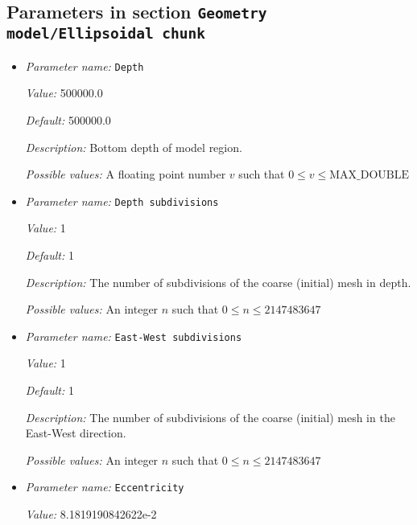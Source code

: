 \subsection{Parameters in section \tt Geometry model/Ellipsoidal chunk}
\label{parameters:Geometry_20model/Ellipsoidal_20chunk}

\begin{itemize}
\item {\it Parameter name:} {\tt Depth}
\label{parameters:Geometry model/Ellipsoidal chunk/Depth}


{\it Value:} 500000.0


{\it Default:} 500000.0


{\it Description:} Bottom depth of model region.


{\it Possible values:} A floating point number $v$ such that $0 \leq v \leq \text{MAX\_DOUBLE}$
\item {\it Parameter name:} {\tt Depth subdivisions}
\label{parameters:Geometry model/Ellipsoidal chunk/Depth subdivisions}


{\it Value:} 1


{\it Default:} 1


{\it Description:} The number of subdivisions of the coarse (initial) mesh in depth.


{\it Possible values:} An integer $n$ such that $0\leq n \leq 2147483647$
\item {\it Parameter name:} {\tt East-West subdivisions}
\label{parameters:Geometry model/Ellipsoidal chunk/East-West subdivisions}


{\it Value:} 1


{\it Default:} 1


{\it Description:} The number of subdivisions of the coarse (initial) mesh in the East-West direction.


{\it Possible values:} An integer $n$ such that $0\leq n \leq 2147483647$
\item {\it Parameter name:} {\tt Eccentricity}
\label{parameters:Geometry model/Ellipsoidal chunk/Eccentricity}


{\it Value:} 8.1819190842622e-2



\end{itemize}
